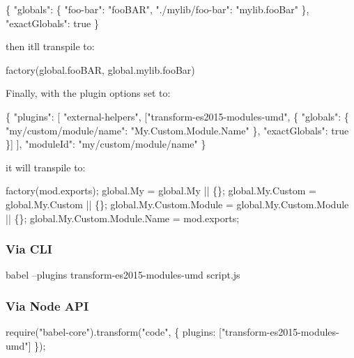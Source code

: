 \begin{DoxyCode}
\{
  "globals": \{
    "foo-bar": "fooBAR",
    "./mylib/foo-bar": "mylib.fooBar"
  \},
  "exactGlobals": true
\}
\end{DoxyCode}


then it\textquotesingle{}ll transpile to\+:


\begin{DoxyCode}
factory(global.fooBAR, global.mylib.fooBar)
\end{DoxyCode}


Finally, with the plugin options set to\+:


\begin{DoxyCode}
\{
  "plugins": [
    "external-helpers",
    ["transform-es2015-modules-umd", \{
      "globals": \{
        "my/custom/module/name": "My.Custom.Module.Name"
      \},
      "exactGlobals": true
    \}]
  ],
  "moduleId": "my/custom/module/name"
\}
\end{DoxyCode}


it will transpile to\+:


\begin{DoxyCode}
factory(mod.exports);
global.My = global.My || \{\};
global.My.Custom = global.My.Custom || \{\};
global.My.Custom.Module = global.My.Custom.Module || \{\};
global.My.Custom.Module.Name = mod.exports;
\end{DoxyCode}


\subsubsection*{Via C\+LI}


\begin{DoxyCode}
babel --plugins transform-es2015-modules-umd script.js
\end{DoxyCode}


\subsubsection*{Via Node A\+PI}


\begin{DoxyCode}
require("babel-core").transform("code", \{
  plugins: ["transform-es2015-modules-umd"]
\});
\end{DoxyCode}
 